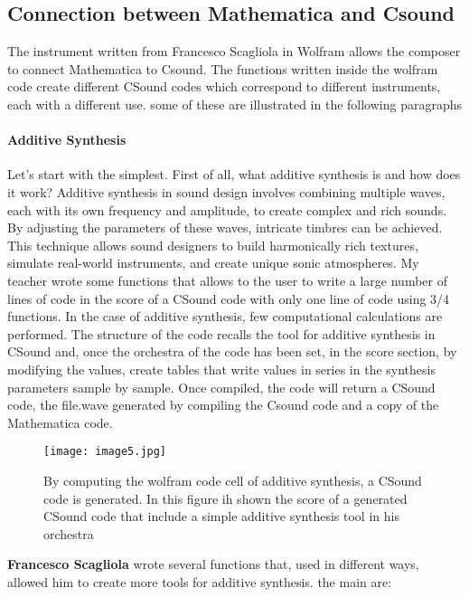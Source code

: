 		\subsection{Connection between Mathematica and Csound}
		The instrument written from Francesco Scagliola in Wolfram allows the composer to connect Mathematica to Csound.
		The functions written inside the wolfram code create different CSound codes which correspond to different instruments, each with a different use. some of these are illustrated in the following paragraphs
		
		\paragraph{Additive Synthesis} Let's start with the simplest.
		First of all, what additive synthesis is and how does it work?
		Additive synthesis in sound design involves combining multiple waves, each with its own frequency and amplitude, to create complex and rich sounds. By adjusting the parameters of these waves, intricate timbres can be achieved. This technique allows sound designers to build harmonically rich textures, simulate real-world instruments, and create unique sonic atmospheres.
		My teacher wrote some functions that allows to the user to write a large number of lines of code in the score of a CSound code with only one line of code using 3/4 functions. In the case of additive synthesis, few computational calculations are performed. 
		The structure of the code recalls the tool for additive synthesis in CSound and, once the orchestra of the code has been set, in the score section, by modifying the values, create tables that write values ​​in series in the synthesis parameters sample by sample. Once compiled, the code will return a CSound code, the file.wave generated by compiling the Csound code and a copy of the Mathematica code.
		
		\begin{figure}[h]
			\begin{center}
				\texttt{[image: image5.jpg]}
				\caption{By computing the wolfram code cell of additive synthesis, a CSound code is generated. In this figure ih shown the score of a generated CSound code that include a simple additive synthesis tool in his orchestra}
			\end{center}
		\end{figure}
		
		\textbf{Francesco Scagliola} wrote several functions that, used in different ways, allowed him to create more tools for additive synthesis. the main are:
		

